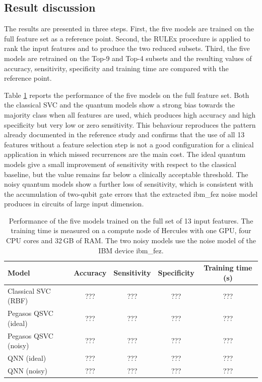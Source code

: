 \subsection{Result discussion}
\label{subsec:discussion}

The results are presented in three steps. First, the five models are trained on the full feature set as a reference point. Second, the RULEx procedure is applied to rank the input features and to produce the two reduced subsets. Third, the five models are retrained on the Top-9 and Top-4 subsets and the resulting values of accuracy, sensitivity, specificity and training time are compared with the reference point.

Table \ref{tab:baseline_all} reports the performance of the five models on the full feature set. Both the classical SVC and the quantum models show a strong bias towards the majority class when all features are used, which produces high accuracy and high specificity but very low or zero sensitivity. This behaviour reproduces the pattern already documented in the reference study and confirms that the use of all 13 features without a feature selection step is not a good configuration for a clinical application in which missed recurrences are the main cost. The ideal quantum models give a small improvement of sensitivity with respect to the classical baseline, but the value remains far below a clinically acceptable threshold. The noisy quantum models show a further loss of sensitivity, which is consistent with the accumulation of two-qubit gate errors that the extracted ibm\_fez noise model produces in circuits of large input dimension.

\begin{table}[t]
\centering
\caption{Performance of the five models trained on the full set of 13 input features. The training time is measured on a compute node of Hercules with one GPU, four CPU cores and 32\,GB of RAM. The two noisy models use the noise model of the IBM device ibm\_fez.}
\label{tab:baseline_all}
\begin{tabular}{lcccc}
\hline
Model                    & Accuracy & Sensitivity & Specificity & Training time (s) \\
\hline
Classical SVC (RBF)      & ???   & ???   & ???   & ???  \\
Pegasos QSVC (ideal)     & ???   & ???   & ???   & ???  \\
Pegasos QSVC (noisy)     & ???   & ???   & ???   & ???  \\
QNN (ideal)              & ???   & ???   & ???   & ???  \\
QNN (noisy)              & ???   & ???   & ???   & ???  \\
\hline
\end{tabular}
\end{table}

